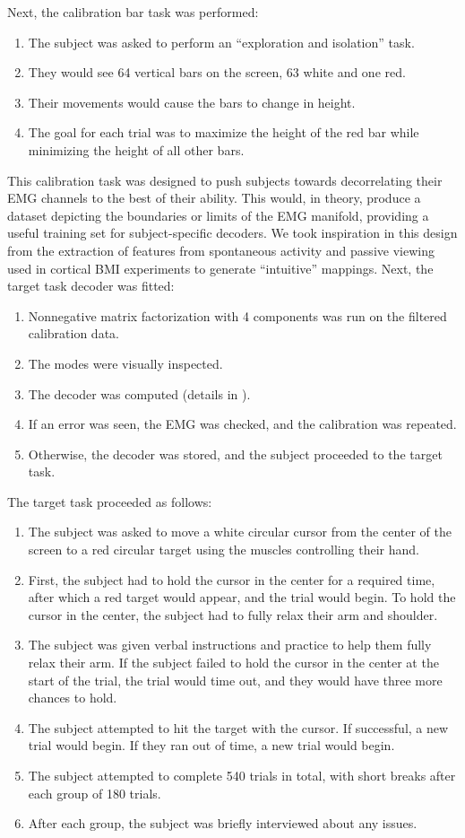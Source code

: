 \documentclass[../main.tex]{subfiles}
\begin{document}
%
Next, the calibration bar task was performed:
%
\begin{enumerate}
  \item The subject was asked to perform an ``exploration and isolation'' task.
  \item They would see 64 vertical bars on the screen, 63 white and one red.
  \item Their movements would cause the bars to change in height.
  \item The goal for each trial was to maximize the height of the red bar while minimizing the height of all other bars.
\end{enumerate}
%
This calibration task was designed to push subjects towards decorrelating their EMG channels to the best of their ability. This would, in theory, produce a dataset depicting the boundaries or limits of the EMG manifold, providing a useful training set for subject-specific decoders. We took inspiration in this design from the extraction of features from spontaneous activity and passive viewing used in cortical BMI experiments to generate ``intuitive'' mappings\cite{clancySensoryRepresentationCausally2019a,sadtlerNeuralConstraintsLearning2014}.
%
Next, the target task decoder was fitted:
%
\begin{enumerate}
  \item Nonnegative matrix factorization with 4 components was run on the filtered calibration data.
  \item The modes were visually inspected.
  \item The decoder was computed (details in ).
  \item If an error was seen, the EMG was checked, and the calibration was repeated.
  \item Otherwise, the decoder was stored, and the subject proceeded to the target task.
\end{enumerate}
%
The target task proceeded as follows:
%
\begin{enumerate}
  \item The subject was asked to move a white circular cursor from the center of the screen to a red circular target using the muscles controlling their hand.
  \item First, the subject had to hold the cursor in the center for a required time, after which a red target would appear, and the trial would begin. To hold the cursor in the center, the subject had to fully relax their arm and shoulder.
  \item The subject was given verbal instructions and practice to help them fully relax their arm.
  If the subject failed to hold the cursor in the center at the start of the trial, the trial would time out, and they would have three more chances to hold.
  \item The subject attempted to hit the target with the cursor. If successful, a new trial would begin. If they ran out of time, a new trial would begin.
  \item The subject attempted to complete 540 trials in total, with short breaks after each group of 180 trials.
  \item After each group, the subject was briefly interviewed about any issues.
\end{enumerate}
\end{document}

